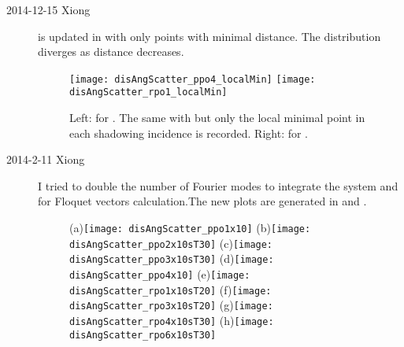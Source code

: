 \begin{description}
\item[2014-12-15 Xiong]
   is updated in
   with only points with minimal
  distance. The distribution diverges as distance decreases.
  \begin{figure}[h]
    \centering
    \texttt{[image: disAngScatter\_ppo4\_localMin]}\hfill
    \texttt{[image: disAngScatter\_rpo1\_localMin]}
    \caption{Left: for .
      The same with  but only
      the local minimal point in each shadowing incidence is recorded. Right:
      for .}
    \label{fig:disAngScatter_localMin}
  \end{figure}


\item[2014-2-11 Xiong]
I tried to double the number of Fourier modes to integrate the system and
for Floquet vectors calculation.The new plots are generated in
 and .

 \begin{figure}[h]
    \centering
    (a)\texttt{[image: disAngScatter\_ppo1x10]}\hfill
    (b)\texttt{[image: disAngScatter\_ppo2x10sT30]}
    (c)\texttt{[image: disAngScatter\_ppo3x10sT30]}
    (d)\texttt{[image: disAngScatter\_ppo4x10]}
    (e)\texttt{[image: disAngScatter\_rpo1x10sT20]}
    (f)\texttt{[image: disAngScatter\_rpo3x10sT20]}
    (g)\texttt{[image: disAngScatter\_rpo4x10sT30]}
    (h)\texttt{[image: disAngScatter\_rpo6x10sT30]}
    \caption{}
    \label{fig:disAngScatterN32_1}
  \end{figure}


\end{description}
